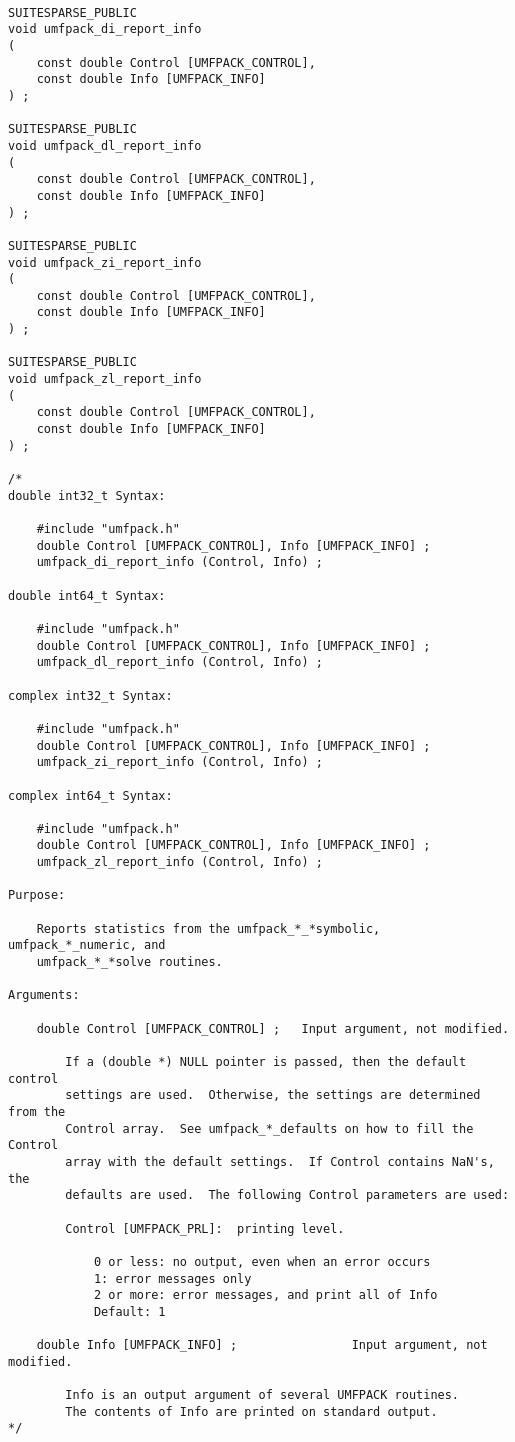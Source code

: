 \documentclass[11pt]{article}
\begin{document}
{\footnotesize
\begin{verbatim}

SUITESPARSE_PUBLIC
void umfpack_di_report_info
(
    const double Control [UMFPACK_CONTROL],
    const double Info [UMFPACK_INFO]
) ;

SUITESPARSE_PUBLIC
void umfpack_dl_report_info
(
    const double Control [UMFPACK_CONTROL],
    const double Info [UMFPACK_INFO]
) ;

SUITESPARSE_PUBLIC
void umfpack_zi_report_info
(
    const double Control [UMFPACK_CONTROL],
    const double Info [UMFPACK_INFO]
) ;

SUITESPARSE_PUBLIC
void umfpack_zl_report_info
(
    const double Control [UMFPACK_CONTROL],
    const double Info [UMFPACK_INFO]
) ;

/*
double int32_t Syntax:

    #include "umfpack.h"
    double Control [UMFPACK_CONTROL], Info [UMFPACK_INFO] ;
    umfpack_di_report_info (Control, Info) ;

double int64_t Syntax:

    #include "umfpack.h"
    double Control [UMFPACK_CONTROL], Info [UMFPACK_INFO] ;
    umfpack_dl_report_info (Control, Info) ;

complex int32_t Syntax:

    #include "umfpack.h"
    double Control [UMFPACK_CONTROL], Info [UMFPACK_INFO] ;
    umfpack_zi_report_info (Control, Info) ;

complex int64_t Syntax:

    #include "umfpack.h"
    double Control [UMFPACK_CONTROL], Info [UMFPACK_INFO] ;
    umfpack_zl_report_info (Control, Info) ;

Purpose:

    Reports statistics from the umfpack_*_*symbolic, umfpack_*_numeric, and
    umfpack_*_*solve routines.

Arguments:

    double Control [UMFPACK_CONTROL] ;   Input argument, not modified.

        If a (double *) NULL pointer is passed, then the default control
        settings are used.  Otherwise, the settings are determined from the
        Control array.  See umfpack_*_defaults on how to fill the Control
        array with the default settings.  If Control contains NaN's, the
        defaults are used.  The following Control parameters are used:

        Control [UMFPACK_PRL]:  printing level.

            0 or less: no output, even when an error occurs
            1: error messages only
            2 or more: error messages, and print all of Info
            Default: 1

    double Info [UMFPACK_INFO] ;                Input argument, not modified.

        Info is an output argument of several UMFPACK routines.
        The contents of Info are printed on standard output.
*/
\end{verbatim}
}
\end{document}

